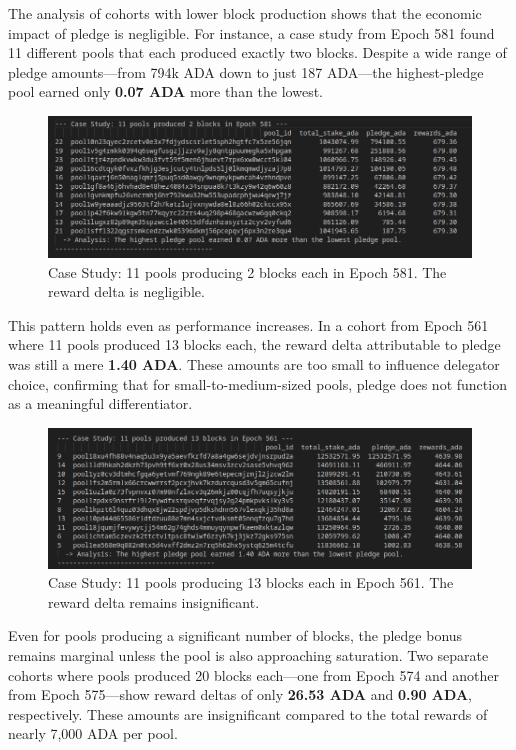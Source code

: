 \documentclass[11pt, letterpaper]{article}
\begin{document}
The analysis of cohorts with lower block production shows that the economic
impact of pledge is negligible. For instance, a case study from Epoch 581 found
11 different pools that each produced exactly two blocks. Despite a wide range
of pledge amounts—from 794k ADA down to just 187 ADA—the highest-pledge pool
earned only \textbf{0.07 ADA} more than the lowest.

\begin{figure}[H]
	\centering
	\includegraphics[width=\textwidth]{img/2blocks-e581.png}
	\caption{Case Study: 11 pools producing 2 blocks each in Epoch 581. The reward delta is negligible.}
	\label{fig:2blocks-e581}
\end{figure}

This pattern holds even as performance increases. In a cohort from Epoch 561
where 11 pools produced 13 blocks each, the reward delta attributable to pledge
was still a mere \textbf{1.40 ADA}. These amounts are too small to influence
delegator choice, confirming that for small-to-medium-sized pools, pledge does
not function as a meaningful differentiator.

\begin{figure}[H]
	\centering
	\includegraphics[width=\textwidth]{img/13blocks-e561.png}
	\caption{Case Study: 11 pools producing 13 blocks each in Epoch 561. The reward delta remains insignificant.}
	\label{fig:13blocks-e561}
\end{figure}

Even for pools producing a significant number of blocks, the pledge bonus
remains marginal unless the pool is also approaching saturation. Two separate
cohorts where pools produced 20 blocks each—one from Epoch 574 and another from
Epoch 575—show reward deltas of only \textbf{26.53 ADA} and \textbf{0.90 ADA},
respectively. These amounts are insignificant compared to the total rewards of
nearly 7,000 ADA per pool.
\end{document}
